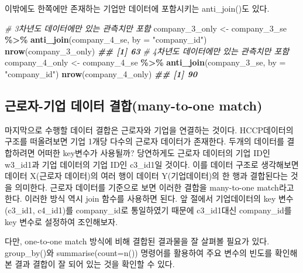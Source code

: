 \documentclass[
]{book}
\newenvironment{Shaded}{\begin{snugshade}}{\end{snugshade}}
\newcommand{\AttributeTok}[1]{\textcolor[rgb]{0.13,0.29,0.53}{#1}}
\newcommand{\CommentTok}[1]{\textcolor[rgb]{0.56,0.35,0.01}{\textit{#1}}}
\newcommand{\DocumentationTok}[1]{\textcolor[rgb]{0.56,0.35,0.01}{\textbf{\textit{#1}}}}
\newcommand{\FunctionTok}[1]{\textcolor[rgb]{0.13,0.29,0.53}{\textbf{#1}}}
\newcommand{\NormalTok}[1]{#1}
\newcommand{\OtherTok}[1]{\textcolor[rgb]{0.56,0.35,0.01}{#1}}
\newcommand{\SpecialCharTok}[1]{\textcolor[rgb]{0.81,0.36,0.00}{\textbf{#1}}}
\newcommand{\StringTok}[1]{\textcolor[rgb]{0.31,0.60,0.02}{#1}}
\begin{document}
이밖에도 한쪽에만 존재하는 기업만 데이터에 포함시키는 anti\_join()도 있다.

\begin{Shaded}
\begin{Highlighting}[]
\CommentTok{\# 3차년도 데이터에만 있는 관측치만 포함}
\NormalTok{company\_3\_only }\OtherTok{\textless{}{-}}\NormalTok{ company\_3\_se }\SpecialCharTok{\%\textgreater{}\%}
  \FunctionTok{anti\_join}\NormalTok{(company\_4\_se, }\AttributeTok{by =} \StringTok{"company\_id"}\NormalTok{)}
\FunctionTok{nrow}\NormalTok{(company\_3\_only)}
\DocumentationTok{\#\# [1] 63}
\CommentTok{\# 4차년도 데이터에만 있는 관측치만 포함}
\NormalTok{company\_4\_only }\OtherTok{\textless{}{-}}\NormalTok{ company\_4\_se }\SpecialCharTok{\%\textgreater{}\%}
  \FunctionTok{anti\_join}\NormalTok{(company\_3\_se, }\AttributeTok{by =} \StringTok{"company\_id"}\NormalTok{)}
\FunctionTok{nrow}\NormalTok{(company\_4\_only)}
\DocumentationTok{\#\# [1] 90}
\end{Highlighting}
\end{Shaded}

\subsection{근로자-기업 데이터 결합(many-to-one match)}\label{uxadfcuxb85cuxc790-uxae30uxc5c5-uxb370uxc774uxd130-uxacb0uxd569many-to-one-match}

마지막으로 수행할 데이터 결합은 근로자와 기업을 연결하는 것이다. HCCP데이터의 구조를 떠올려보면 기업 1개당 다수의 근로자 데이터가 존재한다. 두개의 데이터를 결합하려면 어떠한 key변수가 사용될까? 당연하게도 근로자 데이터의 기업 ID인 w3\_id1과 기업 데이터의 기업 ID인 c3\_id1일 것이다. 이를 데이터 구조로 생각해보면 데이터 X(근로자 데이터)의 여러 행이 데이터 Y(기업데이터)의 한 행과 결합된다는 것을 의미한다. 근로자 데이터를 기준으로 보면 이러한 결합을 many-to-one match라고 한다. 이러한 방식 역시 join 함수를 사용하면 된다. 앞 절에서 기업데이터의 key 변수(c3\_id1, c4\_id1)를 company\_id로 통일하였기 때문에 c3\_id1대신 company\_id를 key 변수로 설정하여 조인해보자.

다만, one-to-one match 방식에 비해 결합된 결과물을 잘 살펴볼 필요가 있다. group\_by()와 summarise(count=n()) 명령어를 활용하여 주요 변수의 빈도를 확인해본 결과 결합이 잘 되어 있는 것을 확인할 수 있다.
\end{document}
